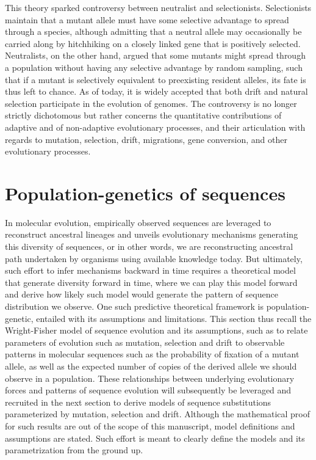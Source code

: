 This theory sparked controversy between neutralist and selectionists.
Selectionists maintain that a mutant allele must have some selective advantage to spread through a species, although admitting that a neutral allele may occasionally be carried along by hitchhiking on a closely linked gene that is positively selected.
Neutralists, on the other hand, argued that some mutants might spread through a population without having any selective advantage by random sampling, such that if a mutant is selectively equivalent to preexisting resident alleles, its fate is thus left to chance.
As of today, it is widely accepted that both \gls{drift} and natural selection participate in the evolution of genomes.
The controversy is no longer strictly dichotomous but rather concerns the quantitative contributions of adaptive and of non-adaptive evolutionary processes, and their articulation with regards to mutation, selection, drift, migrations, gene conversion, and other evolutionary processes.

\section{Population-genetics of sequences}
In molecular evolution, empirically observed sequences are leveraged to reconstruct ancestral lineages and unveils evolutionary mechanisms generating this diversity of sequences, or in other words, we are reconstructing ancestral path undertaken by organisms using available knowledge today.
But ultimately, such effort to infer mechanisms backward in time requires a theoretical model that generate diversity forward in time, where we can play this model forward and derive how likely such model would generate the pattern of sequence distribution we observe.
One such predictive theoretical framework is population-genetic, entailed with its assumptions and limitations.
This section thus recall the Wright-Fisher model of sequence evolution and its assumptions, such as to relate parameters of evolution such as mutation, selection and drift to observable patterns in molecular sequences such as the probability of fixation of a mutant \gls{allele}, as well as the expected number of copies of the derived \gls{allele} we should observe in a population.
These relationships between underlying evolutionary forces and patterns of sequence evolution will subsequently be leveraged and recruited in the next section to derive models of sequence substitutions parameterized by mutation, selection and drift.
Although the mathematical proof for such results are out of the scope of this manuscript, model definitions and assumptions are stated. 
Such effort is meant to clearly define the models and its parametrization from the ground up. 

